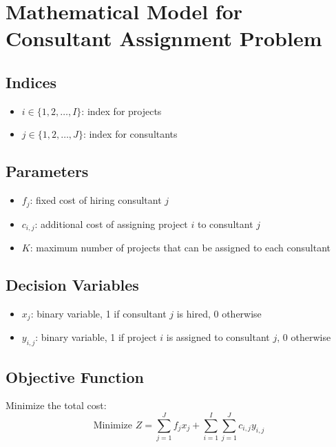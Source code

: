 \documentclass{article}
\begin{document}
\section*{Mathematical Model for Consultant Assignment Problem}

\subsection*{Indices}
\begin{itemize}
    \item $i \in \{1, 2, \ldots, I\}$: index for projects
    \item $j \in \{1, 2, \ldots, J\}$: index for consultants
\end{itemize}

\subsection*{Parameters}
\begin{itemize}
    \item $f_{j}$: fixed cost of hiring consultant $j$
    \item $c_{i,j}$: additional cost of assigning project $i$ to consultant $j$
    \item $K$: maximum number of projects that can be assigned to each consultant
\end{itemize}

\subsection*{Decision Variables}
\begin{itemize}
    \item $x_{j}$: binary variable, 1 if consultant $j$ is hired, 0 otherwise
    \item $y_{i,j}$: binary variable, 1 if project $i$ is assigned to consultant $j$, 0 otherwise
\end{itemize}

\subsection*{Objective Function}
Minimize the total cost:
\[
\text{Minimize } Z = \sum_{j=1}^{J} f_{j} x_{j} + \sum_{i=1}^{I} \sum_{j=1}^{J} c_{i,j} y_{i,j}
\]
\end{document}
